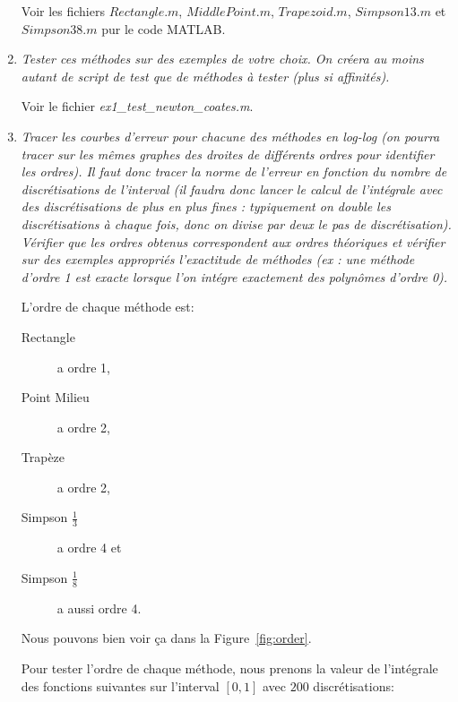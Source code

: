 \documentclass[a4paper,10pt]{article}
\begin{document}
\begin{enumerate}
    Voir les fichiers $Rectangle.m$, $MiddlePoint.m$, $Trapezoid.m$,
    $Simpson13.m$ et $Simpson38.m$ pur le code MATLAB.

    \item \emph{Tester ces méthodes sur des exemples de votre choix. On créera au moins
    autant de script de test que de méthodes à tester (plus si affinités).}

    Voir le fichier \emph{ex1\_test\_newton\_coates.m}.

    \item \emph{Tracer les courbes d'erreur pour chacune des méthodes en log-log (on
    pourra tracer sur les mêmes graphes des droites de différents ordres pour
    identifier les ordres). Il faut donc tracer la norme de l'erreur en fonction
    du nombre de discrétisations de l'interval (il faudra donc lancer le calcul de
    l'intégrale avec des discrétisations de plus en plus fines : typiquement on
    double les discrétisations à chaque fois, donc on divise par deux le pas de
    discrétisation). Vérifier que les ordres obtenus correspondent aux ordres
    théoriques et vérifier sur des exemples appropriés l'exactitude de méthodes
    (ex : une méthode d'ordre 1 est exacte lorsque l'on intégre exactement des
    polynômes d'ordre 0).}

    L'ordre de chaque méthode est:
    \begin{description}
        \item[Rectangle] a ordre 1,
        \item[Point Milieu] a ordre 2,
        \item[Trapèze] a ordre 2,
        \item[Simpson $\frac{1}{3}$] a ordre 4 et
        \item[Simpson $\frac{1}{8}$] a aussi ordre 4.
    \end{description}

    Nous pouvons bien voir ça dans la Figure~\ref{fig:order}.

    Pour tester l'ordre de chaque méthode, nous prenons la valeur de l'intégrale des
    fonctions suivantes sur l'interval $[0, 1]$ avec $200$ discrétisations:

{
\renewcommand{\arraystretch}{1.2}
\begin{center}
\begin{tabular}{|l|l|l|l|l|l|l|}\hline


\end{tabular}
\end{center}}
\end{enumerate}
\end{document}
